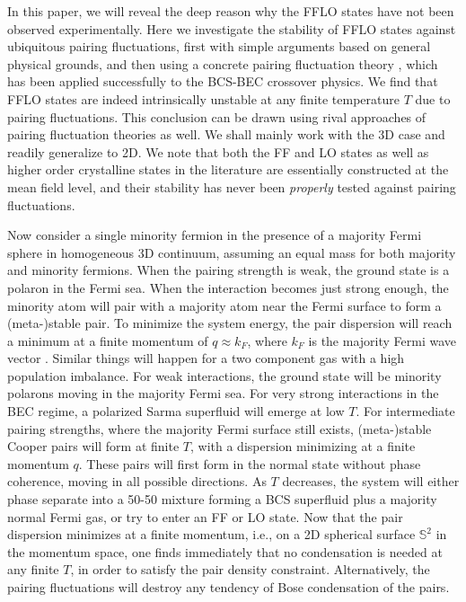 \documentclass[aps,twocolumn,prl,tightenlines,floatfix]{revtex4-1}
\begin{document}
In this paper, we will reveal the deep reason why the FFLO states have
not been observed experimentally. 
%
Here we investigate the stability of FFLO states against ubiquitous
pairing fluctuations, first with simple arguments based on general
physical grounds, and then using a concrete pairing fluctuation theory
\cite{Chen2,Review}, which has been applied successfully to the
BCS-BEC crossover physics.  We find that FFLO states are indeed
intrinsically unstable at any finite temperature $T$ due to pairing
fluctuations. This conclusion can be drawn using rival approaches of
pairing fluctuation theories as well. We shall mainly work with the 3D
case and readily generalize to 2D.
%
We note that both the FF and LO states as well as higher order crystalline
states in the literature are essentially constructed at the mean field
level, and their stability has never been \emph{properly} tested against
pairing fluctuations.

Now consider a single minority fermion in the presence of a majority
Fermi sphere in homogeneous 3D continuum, assuming an equal mass for
both majority and minority fermions. When the pairing strength is
weak, the ground state is a polaron in the Fermi sea.  When the
interaction becomes just strong enough, the minority atom will pair
with a majority atom near the Fermi surface to form a (meta-)stable
pair. To minimize the system energy, the pair dispersion will reach a
minimum at a finite momentum of $q\approx k_F$, where $k_F$ is the
majority Fermi wave vector \cite{footnoteonBECpairing}. Similar things
will happen for a two component gas with a high population
imbalance. For weak interactions, the ground state will be minority
polarons moving in the majority Fermi sea. For very strong
interactions in the BEC regime, a polarized Sarma superfluid will
emerge at low $T$. For intermediate pairing strengths, where the
majority Fermi surface still exists, (meta-)stable Cooper pairs will
form at finite $T$, with a dispersion minimizing at a finite momentum
$q$. These pairs will first form in the normal state without phase
coherence, moving in all possible directions. As $T$ decreases, the
system will either phase separate into a 50-50 mixture forming a BCS
superfluid plus a majority normal Fermi gas, or try to enter an FF or
LO state. Now that the pair dispersion minimizes at a finite momentum,
i.e., on a 2D spherical surface $\mathbb{S}^2$ in the momentum space,
one finds immediately that no condensation is needed at any finite
$T$, in order to satisfy the pair density constraint. Alternatively,
the pairing fluctuations will destroy any tendency of Bose
condensation of the pairs.
\end{document}
